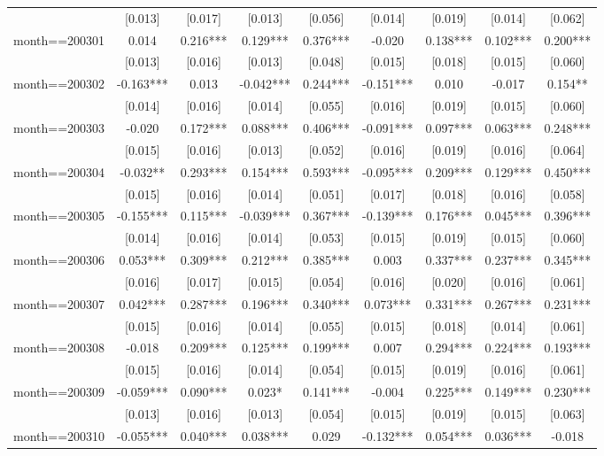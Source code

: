 \documentclass[]{article}
\begin{document}
\begin{tabular}{lcccccccc}
 & [0.013] & [0.017] & [0.013] & [0.056] & [0.014] & [0.019] & [0.014] & [0.062] \\
month==200301 & 0.014 & 0.216*** & 0.129*** & 0.376*** & -0.020 & 0.138*** & 0.102*** & 0.200*** \\
 & [0.013] & [0.016] & [0.013] & [0.048] & [0.015] & [0.018] & [0.015] & [0.060] \\
month==200302 & -0.163*** & 0.013 & -0.042*** & 0.244*** & -0.151*** & 0.010 & -0.017 & 0.154** \\
 & [0.014] & [0.016] & [0.014] & [0.055] & [0.016] & [0.019] & [0.015] & [0.060] \\
month==200303 & -0.020 & 0.172*** & 0.088*** & 0.406*** & -0.091*** & 0.097*** & 0.063*** & 0.248*** \\
 & [0.015] & [0.016] & [0.013] & [0.052] & [0.016] & [0.019] & [0.016] & [0.064] \\
month==200304 & -0.032** & 0.293*** & 0.154*** & 0.593*** & -0.095*** & 0.209*** & 0.129*** & 0.450*** \\
 & [0.015] & [0.016] & [0.014] & [0.051] & [0.017] & [0.018] & [0.016] & [0.058] \\
month==200305 & -0.155*** & 0.115*** & -0.039*** & 0.367*** & -0.139*** & 0.176*** & 0.045*** & 0.396*** \\
 & [0.014] & [0.016] & [0.014] & [0.053] & [0.015] & [0.019] & [0.015] & [0.060] \\
month==200306 & 0.053*** & 0.309*** & 0.212*** & 0.385*** & 0.003 & 0.337*** & 0.237*** & 0.345*** \\
 & [0.016] & [0.017] & [0.015] & [0.054] & [0.016] & [0.020] & [0.016] & [0.061] \\
month==200307 & 0.042*** & 0.287*** & 0.196*** & 0.340*** & 0.073*** & 0.331*** & 0.267*** & 0.231*** \\
 & [0.015] & [0.016] & [0.014] & [0.055] & [0.015] & [0.018] & [0.014] & [0.061] \\
month==200308 & -0.018 & 0.209*** & 0.125*** & 0.199*** & 0.007 & 0.294*** & 0.224*** & 0.193*** \\
 & [0.015] & [0.016] & [0.014] & [0.054] & [0.015] & [0.019] & [0.016] & [0.061] \\
month==200309 & -0.059*** & 0.090*** & 0.023* & 0.141*** & -0.004 & 0.225*** & 0.149*** & 0.230*** \\
 & [0.013] & [0.016] & [0.013] & [0.054] & [0.015] & [0.019] & [0.015] & [0.063] \\
month==200310 & -0.055*** & 0.040*** & 0.038*** & 0.029 & -0.132*** & 0.054*** & 0.036*** & -0.018 \\

\end{tabular}
\end{document}
